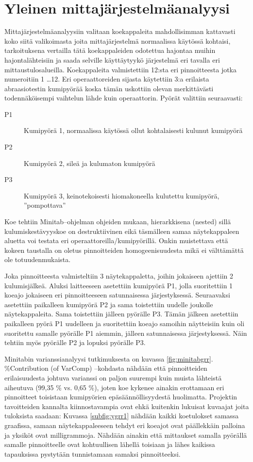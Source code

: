 \documentclass[12pt,a4paper,finnish]{tutthesis}
\begin{document}
\section{Yleinen mittajärjestelmäanalyysi}

Mittajärjestelmäanalyysiin valitaan koekappaleita mahdollisimman kattavasti koko siitä valikoimasta joita mittajärjestelmä normaalissa käytössä kohtaisi, tarkoituksena vertailla tätä koekappaleiden odotettua hajontaa muihin hajontalähteisiin ja saada selville käyttäytyykö järjestelmä eri tavalla eri mittaustulosalueilla. Koekappaleita valmistettiin 12:sta eri pinnoitteesta jotka
numeroitiin 1 \ldots 12.
Eri operaattoreiden sijasta käytettiin 3:a erilaista abraasiotestin kumipyörää koska tämän
uskottiin olevan merkittävästi todennäköisempi vaihtelun lähde kuin operaattorin. Pyörät
valittiin seuraavasti:

\begin{description}
  \item[P1] Kumipyörä 1, normaalissa käytössä ollut kohtalaisesti kulunut kumipyörä
  \item[P2] Kumipyörä 2, sileä ja kulumaton kumipyörä
  \item[P3] Kumipyörä 3, keinotekoisesti hiomakoneella kulutettu kumipyörä, ”pompottava”
\end{description}

Koe tehtiin Minitab–ohjelman ohjeiden mukaan, hierarkkisena (nested) sillä kulumiskestävyyskoe on destruktiivinen eikä täsmälleen samaa näytekappaleen aluetta voi testata eri operaattoreilla/kumipyörillä. Onkin muistettava että kokeen taustalla on oletus pinnoitteiden homogeenisuudesta mikä ei välttämättä ole totuudenmukaista.

Joka pinnoitteesta valmisteltiin 3 näytekappaletta, joihin jokaiseen ajettiin 2 kulumisjälkeä. Aluksi laitteeseen asetettiin kumipyörä P1, jolla suoritettiin 1 koeajo jokaiseen eri pinnoitteeseen satunnaisessa järjestyksessä. Seuraavaksi asetettiin paikalleen kumipyörä P2 ja sama toistettiin uudelle joukolle näytekappaleita. Sama toistettiin jälleen pyörälle P3. Tämän jälkeen asetettiin paikalleen pyörä P1 uudelleen ja suoritettiin koeajo samoihin näytteisiin kuin oli suoritettu samalle pyörälle P1 aiemmin, jälleen satunnaisessa järjestyksessä. Näin tehtiin myös pyörälle P2 ja lopuksi pyörälle P3.

Minitabin varianssianalyysi tutkimuksesta on kuvassa \ref{fig:minitabgrr}.
\%Contribution (of VarComp) –kohdasta nähdään että pinnoitteiden erilaisuudesta johtuva varianssi on paljon suurempi kuin muista lähteistä aiheutuva (99,35 \% vs. 0,65 \%), joten koe kykenee ainakin erottamaan eri pinnoitteet toisistaan kumipyörien epäsäännöllisyydestä huolimatta. Projektin tavoitteiden kannalta kiinnostavampia ovat ehkä kuitenkin lukuisat kuvaajat joita tuloksista saadaan: Kuvassa \ref{subfig:ygrr1} nähdään kaikki koetulokset samassa graafissa, samaan näytekappaleeseen tehdyt eri koeajot ovat päällekkäin palloina ja yksiköt ovat milligrammoja.
Nähdään ainakin että mittaukset samalla pyörällä samalle pinnoitteelle ovat kohtuullisen lähellä toisiaan ja lähes kaikissa tapauksissa pystytään tunnistamaan samaksi pinnoitteeksi.
\end{document}
